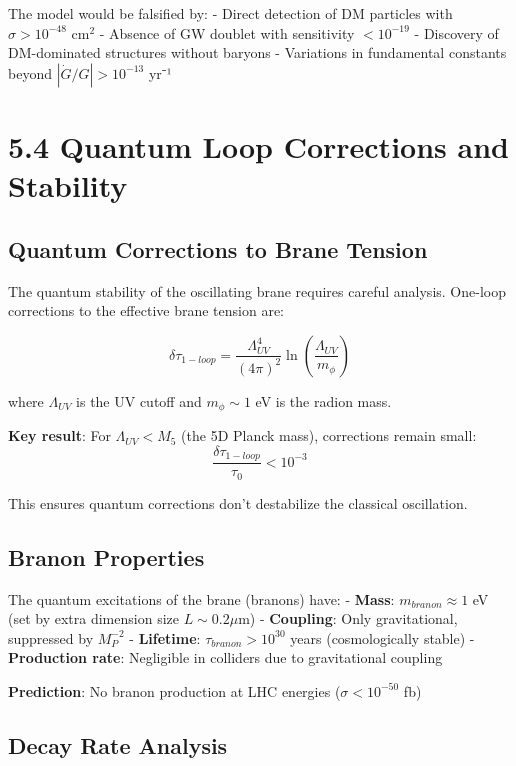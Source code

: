 \documentclass[
  11pt,
]{report}
\begin{document}
The model would be falsified by: - Direct detection of DM particles with
\(\sigma > 10^{-48}\) cm\(^2\) - Absence of GW doublet with sensitivity
\(< 10^{-19}\) - Discovery of DM-dominated structures without baryons -
Variations in fundamental constants beyond \(|\dot{G}/G| > 10^{-13}\)
yr⁻¹

\section{5.4 Quantum Loop Corrections and
Stability}\label{quantum-loop-corrections-and-stability}

\subsection{Quantum Corrections to Brane
Tension}\label{quantum-corrections-to-brane-tension}

The quantum stability of the oscillating brane requires careful
analysis. One-loop corrections to the effective brane tension are:

\[\delta\tau_{1-loop} = \frac{\Lambda_{UV}^4}{(4\pi)^2} \ln\left(\frac{\Lambda_{UV}}{m_\phi}\right)\]

where \(\Lambda_{UV}\) is the UV cutoff and \(m_\phi \sim 1\) eV is the
radion mass.

\textbf{Key result}: For \(\Lambda_{UV} < M_5\) (the 5D Planck mass),
corrections remain small:
\[\frac{\delta\tau_{1-loop}}{\tau_0} < 10^{-3}\]

This ensures quantum corrections don't destabilize the classical
oscillation.

\subsection{Branon Properties}\label{branon-properties}

The quantum excitations of the brane (branons) have: - \textbf{Mass}:
\(m_{branon} \approx 1\) eV (set by extra dimension size
\(L \sim 0.2 \mu\)m) - \textbf{Coupling}: Only gravitational, suppressed
by \(M_P^{-2}\) - \textbf{Lifetime}: \(\tau_{branon} > 10^{30}\) years
(cosmologically stable) - \textbf{Production rate}: Negligible in
colliders due to gravitational coupling

\textbf{Prediction}: No branon production at LHC energies
(\(\sigma < 10^{-50}\) fb)

\subsection{Decay Rate Analysis}\label{decay-rate-analysis}
\end{document}
